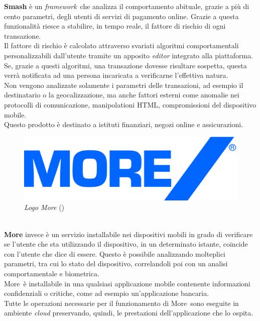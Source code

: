 \textbf{Smash\textregistered} è un \emph{framework}\glsfirstoccur\ che analizza il comportamento abituale, grazie a più di cento parametri, degli utenti di servizi di pagamento online. Grazie a questa funzionalità riesce a stabilire, in tempo reale, il fattore di rischio di ogni transazione.\\
Il fattore di rischio è calcolato attraverso svariati algoritmi comportamentali personalizzabili dall'utente tramite un apposito \textit{editor} integrato alla piattaforma. Se, grazie a questi algoritmi, una transazione dovesse risultare sospetta, questa verrà notificata ad una persona incaricata a verificarne l'effettiva natura.\\
Non vengono analizzate solamente i parametri delle transazioni, ad esempio il destinatario o la geocalizzazione, ma anche fattori esterni come anomalie nei protocolli di comunicazione, manipolationi HTML, compromissioni del dispositivo mobile.\\
Questo prodotto è destinato a istituti finanziari, negozi online e assicurazioni.\\
\begin{figure}[h!]
	\centering
	\includegraphics[scale=0.1]{immagini/more.png}
	\caption{\textit{Logo More\textregistered} ()}
\end{figure}
\\
\textbf{More\textregistered} invece è un servizio installabile nei dispositivi mobili in grado di verificare se l'utente che sta utilizzando il dispositivo, in un determinato istante, coincide con l'utente che dice di essere. Questo è possibile analizzando molteplici parametri, tra cui lo stato del dispositivo, correlandoli poi con un analisi comportamentale e biometrica.\\
More\textregistered\ è installabile in una qualsiasi applicazione mobile contenente informazioni confidenziali o critiche, come ad esempio un'applicazione bancaria.\\
Tutte le operazioni necessarie per il funzionamento di More\textregistered\ sono eseguite in ambiente \textit{cloud} preservando, quindi, le prestazioni dell'applicazione che lo ospita.


